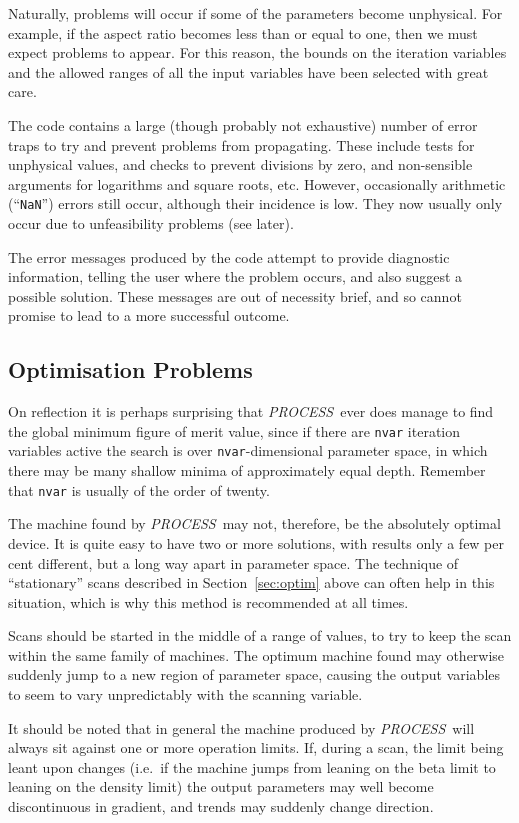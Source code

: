 \documentclass[11pt,a4paper]{report}
\newcommand{\PS}{\mbox{\it PROCESS\/ }}
\begin{document}
Naturally, problems will occur if some of the parameters become unphysical.
For example, if the aspect ratio becomes less than or equal to one, then we
must expect problems to appear. For this reason, the bounds on the iteration
variables and the allowed ranges of all the input variables have been selected
with great care.

The code contains a large (though probably not exhaustive) number of error
traps to try and prevent problems from propagating. These include tests for
unphysical values, and checks to prevent divisions by zero, and non-sensible
arguments for logarithms and square roots, etc. However, occasionally
arithmetic (``{\tt NaN}'') errors still occur, although their incidence is
low. They now usually only occur due to unfeasibility problems (see later).

The error messages produced by the code attempt to provide diagnostic
information, telling the user where the problem occurs, and also suggest a
possible solution. These messages are out of necessity brief, and so cannot
promise to lead to a more successful outcome.

\subsection{Optimisation Problems}

On reflection it is perhaps surprising that \PS ever does manage to find the
global minimum figure of merit value, since if there are {\tt nvar} iteration
variables active the search is over {\tt nvar}-dimensional parameter space, in
which there may be many shallow minima of approximately equal depth. Remember
that {\tt nvar} is usually of the order of twenty.

The machine found by \PS may not, therefore, be the absolutely optimal
device. It is quite easy to have two or more solutions, with results only a
few per cent different, but a long way apart in parameter space. The technique
of ``stationary'' scans described in Section~\ref{sec:optim} above can often
help in this situation, which is why this method is recommended at all times.

Scans should be started in the middle of a range of values, to try to keep the
scan within the same family of machines. The optimum machine found may
otherwise suddenly jump to a new region of parameter space, causing the output
variables to seem to vary unpredictably with the scanning variable.

It should be noted that in general the machine produced by \PS will always sit
against one or more operation limits. If, during a scan, the limit being leant
upon changes (i.e.\ if the machine jumps from leaning on the beta limit to
leaning on the density limit) the output parameters may well become
discontinuous in gradient, and trends may suddenly change direction.
\end{document}

